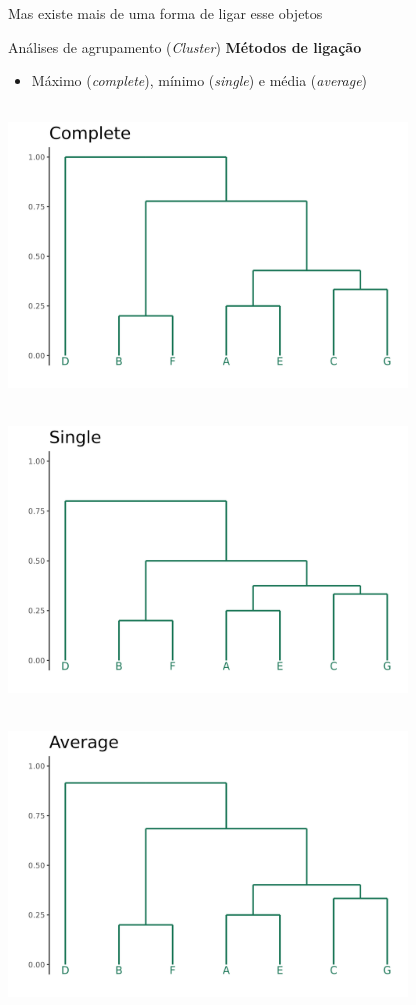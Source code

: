 \documentclass[
  ignorenonframetext,
]{beamer}
\providecommand{\tightlist}{%
  \setlength{\itemsep}{0pt}\setlength{\parskip}{0pt}}\usepackage{longtable,booktabs,array}
\begin{document}
\begin{frame}{Mas existe mais de uma forma de ligar esse objetos}
\protect\hypertarget{mas-existe-mais-de-uma-forma-de-ligar-esse-objetos}{}
\begin{block}{Análises de agrupamento (\emph{Cluster})}
\protect\hypertarget{anuxe1lises-de-agrupamento-cluster-14}{}
\textbf{Métodos de ligação}

\begin{itemize}
\tightlist
\item
  Máximo (\emph{complete}), mínimo (\emph{single}) e média
  (\emph{average})
\end{itemize}

\includegraphics[width=4.16667in,height=3.125in]{img/cluster_19.png}
\includegraphics[width=4.16667in,height=3.125in]{img/cluster_20.png}
\includegraphics[width=4.16667in,height=3.125in]{img/cluster_21.png}


\end{block}
\end{frame}
\end{document}
